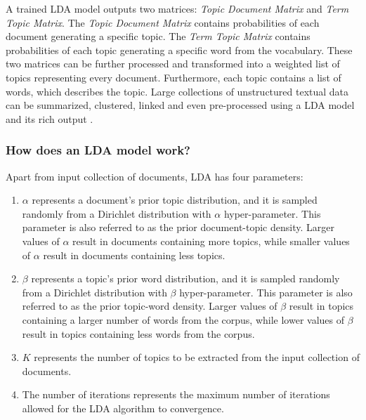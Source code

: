             A trained LDA model outputs two matrices: \emph{Topic Document Matrix} and \emph{Term Topic Matrix}. The \emph{Topic Document Matrix} contains probabilities of each document generating a specific topic. The \emph{Term Topic Matrix} contains probabilities of each topic generating a specific word from the vocabulary. These two matrices can be further processed and transformed into a weighted list of topics representing every document. Furthermore, each topic contains a list of words, which describes the topic. Large collections of unstructured textual data can be summarized, clustered, linked and even pre-processed using a LDA model and its rich output \cite{campbell2015latent}.
        
        \subsubsection{How does an LDA model work?}
        
            Apart from input collection of documents, LDA has four parameters:
            
            \begin{enumerate}
                \item $\alpha$ represents a document's prior topic distribution, and it is sampled randomly from a Dirichlet distribution with $\alpha$ hyper-parameter. This parameter is also referred to as the prior document-topic density. Larger values of $\alpha$ result in documents containing more topics, while smaller values of $\alpha$ result in documents containing less topics. 
                
                \item $\beta$ represents a topic's prior word distribution, and it is sampled randomly from a Dirichlet distribution with $\beta$ hyper-parameter. This parameter is also referred to as the prior topic-word density. Larger values of $\beta$ result in topics containing a larger number of words from the corpus, while lower values of $\beta$ result in topics containing less words from the corpus.
                
                \item $K$ represents the number of topics to be extracted from the input collection of documents.
                
                \item The number of iterations represents the maximum number of iterations allowed for the LDA algorithm to convergence.
            \end{enumerate}
        
